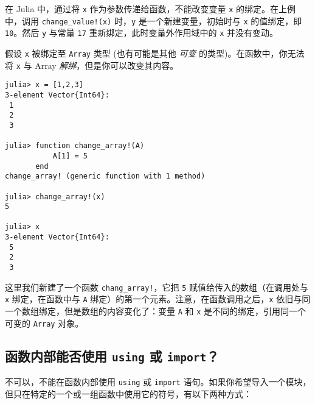 在 Julia 中，通过将 \texttt{x} 作为参数传递给函数，不能改变变量 \texttt{x} 的绑定。在上例中，调用 \texttt{change\_value!(x)} 时，\texttt{y} 是一个新建变量，初始时与 \texttt{x} 的值绑定，即 \texttt{10}。然后 \texttt{y} 与常量 \texttt{17} 重新绑定，此时变量外作用域中的 \texttt{x} 并没有变动。



假设 \texttt{x} 被绑定至 \texttt{Array} 类型 (也有可能是其他 \emph{可变} 的类型)。在函数中，你无法将 \texttt{x} 与 Array \emph{解绑}，但是你可以改变其内容。




\begin{verbatim}
julia> x = [1,2,3]
3-element Vector{Int64}:
 1
 2
 3

julia> function change_array!(A)
           A[1] = 5
       end
change_array! (generic function with 1 method)

julia> change_array!(x)
5

julia> x
3-element Vector{Int64}:
 5
 2
 3
\end{verbatim}



这里我们新建了一个函数 \texttt{chang\_array!}，它把 \texttt{5} 赋值给传入的数组（在调用处与 \texttt{x} 绑定，在函数中与 \texttt{A} 绑定）的第一个元素。注意，在函数调用之后，\texttt{x} 依旧与同一个数组绑定，但是数组的内容变化了：变量 \texttt{A} 和 \texttt{x} 是不同的绑定，引用同一个可变的 \texttt{Array} 对象。



\hypertarget{10749355378766657270}{}


\subsection{函数内部能否使用 \texttt{using} 或 \texttt{import}？}



不可以，不能在函数内部使用 \texttt{using} 或 \texttt{import} 语句。如果你希望导入一个模块，但只在特定的一个或一组函数中使用它的符号，有以下两种方式：



